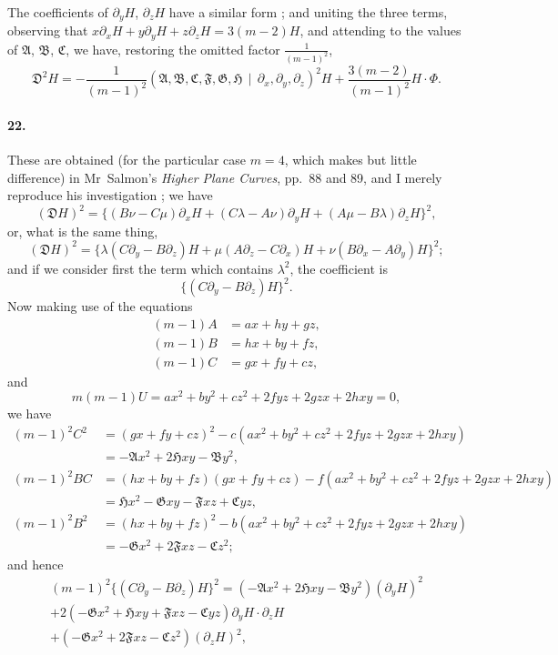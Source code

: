 \documentclass[12pt,a4paper]{article}
\theoremstyle{plain}
\begin{document}
The  coefficients  of  $\partial_y H$,  $\partial_z H$  have  a  similar  form ;  and  uniting  the  three  terms,
observing   that  $x\partial_x H + y\partial_y H + z\partial_z H = 3(m-2)H$,  and   attending  to  the  values
of  $\mathfrak{A}$,  $\mathfrak{B}$,  $\mathfrak{C}$,  we  have,  restoring  the  omitted  factor  $\frac{1}{(m-1)^2}$,
\[
\mathfrak{D}^2 H = -\frac{1}{(m-1)^2}(\mathfrak{A}, \mathfrak{B}, \mathfrak{C}, \mathfrak{F}, \mathfrak{G}, \mathfrak{H} \,\!\!\mid\, \partial_x, \partial_y, \partial_z)^2 H + \frac{3(m-2)}{(m-1)^2} H \cdot \Phi.
\]


\paragraph{22.}
These  are  obtained  (for  the  particular  case  $m = 4$,  which  makes  but  little
difference)  in  Mr~Salmon's  \textit{Higher  Plane  Curves},  pp.~88  and  89,  and  I  merely  reproduce
his  investigation ;    we  have
\[
(\mathfrak{D} H)^2 = \{(B\nu - C\mu)\partial_x H + (C\lambda - A\nu)\partial_y H + (A\mu - B\lambda)\partial_z H\}^2,
\]
or,  what  is  the  same  thing,
\[
(\mathfrak{D} H)^2 = \{\lambda(C\partial_y - B\partial_z)H + \mu(A\partial_z - C\partial_x)H + \nu(B\partial_x - A\partial_y)H\}^2;
\]
and  if  we  consider  first  the  term  which  contains  $\lambda^2$,  the  coefficient  is
\[
\{(C\partial_y - B\partial_z)H\}^2.
\]
Now  making  use  of  the  equations
\begin{align*}
(m-1)A &= ax + hy + gz, \\
(m-1)B &= hx + by + fz, \\
(m-1)C &= gx + fy + cz,
\end{align*}
and
\[
m(m-1)U = ax^2 + by^2 + cz^2 + 2fyz + 2gzx + 2hxy = 0,
\]
we   have
\begin{align*}
(m-1)^2 C^2 &= (gx + fy + cz)^2 - c(ax^2 + by^2 + cz^2 + 2fyz + 2gzx + 2hxy) \\
&= -\mathfrak{A}x^2 + 2\mathfrak{H}xy - \mathfrak{B}y^2, \\
(m-1)^2 BC &= (hx + by + fz)(gx + fy + cz) - f(ax^2 + by^2 + cz^2 + 2fyz + 2gzx + 2hxy) \\
&= \mathfrak{H}x^2 - \mathfrak{G}xy - \mathfrak{F}xz + \mathfrak{C}yz, \\
(m-1)^2 B^2 &= (hx + by + fz)^2 - b(ax^2 + by^2 + cz^2 + 2fyz + 2gzx + 2hxy) \\
&= -\mathfrak{G}x^2 + 2\mathfrak{F}xz - \mathfrak{C}z^2;
\end{align*}
and  hence
\begin{multline*}
(m-1)^2 \{(C\partial_y - B\partial_z)H\}^2 = (-\mathfrak{A}x^2 + 2\mathfrak{H}xy - \mathfrak{B}y^2)(\partial_y H)^2 \\
+ 2(-\mathfrak{G}x^2 + \mathfrak{H}xy + \mathfrak{F}xz - \mathfrak{C}yz) \partial_y H \cdot \partial_z H \\
+ (-\mathfrak{G}x^2 + 2\mathfrak{F}xz - \mathfrak{C}z^2)(\partial_z H)^2,
\end{multline*}
\end{document}
